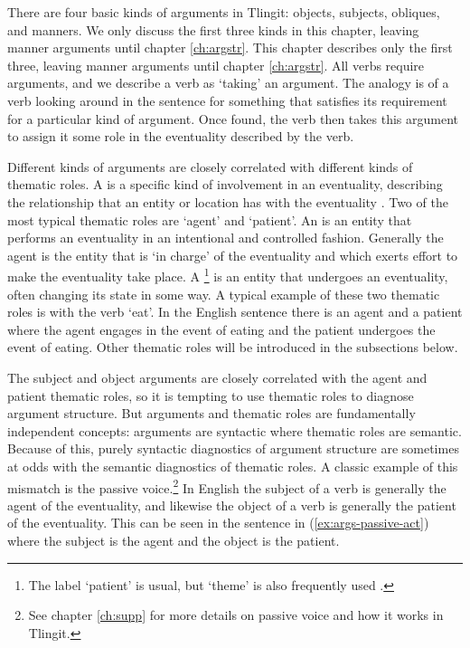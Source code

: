 There are four basic kinds of arguments in Tlingit: objects, subjects, obliques, and manners. We only discuss the first three kinds in this chapter, leaving manner arguments until chapter \ref{ch:argstr}. This chapter describes only the first three, leaving manner arguments until chapter \ref{ch:argstr}. All verbs require arguments, and we describe a verb as ‘taking’ an argument. The analogy is of a verb looking around in the sentence for something that satisfies its requirement for a particular kind of argument. Once found, the verb then takes this argument to assign it some role in the eventuality described by the verb.

Different kinds of arguments are closely correlated with different kinds of thematic roles. A  is a specific kind of involvement in an eventuality, describing the relationship that an entity or location has with the eventuality \parencites{blake:2001}{levin-rappaport-hovav:2005}{davis:2011a}. Two of the most typical thematic roles are ‘agent’ and ‘patient’. An  is an entity that performs an eventuality in an intentional and controlled fashion. Generally the agent is the entity that is ‘in charge’ of the eventuality and which exerts effort to make the eventuality take place. A \footnote{The label ‘patient’ is usual, but ‘theme’ is also frequently used \parencite[67]{blake:2001}.} is an entity that undergoes an eventuality, often changing its state in some way. A typical example of these two thematic roles is with the verb ‘eat’. In the English sentence  there is an agent  and a patient  where the agent engages in the event of eating and the patient undergoes the event of eating. Other thematic roles will be introduced in the subsections below.

The subject and object arguments are closely correlated with the agent and patient thematic roles, so it is tempting to use thematic roles to diagnose argument structure. But arguments and thematic roles are fundamentally independent concepts: arguments are syntactic where thematic roles are semantic. Because of this, purely syntactic diagnostics of argument structure are sometimes at odds with the semantic diagnostics of thematic roles. A classic example of this mismatch is the passive voice.\footnote{See chapter \ref{ch:supp} for more details on passive voice and how it works in Tlingit.} In English the subject of a verb is generally the agent of the eventuality, and likewise the object of a verb is generally the patient of the eventuality. This can be seen in the sentence in (\ref{ex:args-passive-act}) where the subject  is the agent and the object  is the patient.

